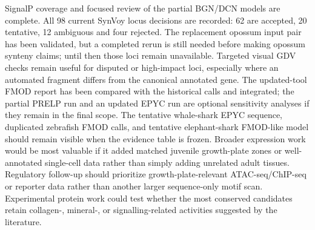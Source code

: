 SignalP coverage and focused review of the partial BGN/DCN models are complete.
All 98 current SynVoy locus decisions are recorded: 62 are accepted, 20
tentative, 12 ambiguous and four rejected. The replacement opossum input pair
has been validated, but a completed rerun is still needed before making
opossum synteny claims; until then those loci remain unavailable. Targeted
visual GDV checks remain useful for disputed or
high-impact loci, especially where an automated fragment differs from the
canonical annotated gene. The updated-tool FMOD report has been compared with
the historical calls and integrated; the partial PRELP run and
an updated EPYC run are optional sensitivity analyses if they remain in the
final scope. The tentative whale-shark EPYC sequence, duplicated zebrafish
FMOD calls, and tentative elephant-shark FMOD-like model should remain visible
when the evidence table is frozen. Broader expression work would be most
valuable if it added matched
juvenile growth-plate zones or well-annotated single-cell data rather than simply
adding unrelated adult tissues. Regulatory follow-up should prioritize
growth-plate-relevant ATAC-seq/ChIP-seq or reporter data rather than another
larger sequence-only motif scan. Experimental protein work could test whether
the most conserved candidates retain collagen-, mineral-, or signalling-related
activities suggested by the literature.

